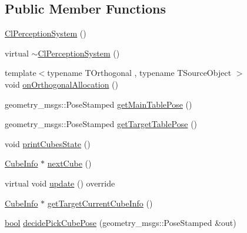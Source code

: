 \subsection*{Public Member Functions}
\begin{DoxyCompactItemize}
\item 
\hyperlink{classsm__fetch__screw__loop__1_1_1cl__perception__system_1_1ClPerceptionSystem_a1fef881e55daa7cf9dd314b7e39d26f6}{Cl\+Perception\+System} ()
\item 
virtual \hyperlink{classsm__fetch__screw__loop__1_1_1cl__perception__system_1_1ClPerceptionSystem_ae6a3da6a51db614cc1131f495ff10ec3}{$\sim$\+Cl\+Perception\+System} ()
\item 
{\footnotesize template$<$typename T\+Orthogonal , typename T\+Source\+Object $>$ }\\void \hyperlink{classsm__fetch__screw__loop__1_1_1cl__perception__system_1_1ClPerceptionSystem_ad6620a9824a17322ed043a1c1f4283c4}{on\+Orthogonal\+Allocation} ()
\item 
geometry\+\_\+msgs\+::\+Pose\+Stamped \hyperlink{classsm__fetch__screw__loop__1_1_1cl__perception__system_1_1ClPerceptionSystem_a8d206006205507fb2a34c0fc0fa80abb}{get\+Main\+Table\+Pose} ()
\item 
geometry\+\_\+msgs\+::\+Pose\+Stamped \hyperlink{classsm__fetch__screw__loop__1_1_1cl__perception__system_1_1ClPerceptionSystem_a11be4da365581400d03e897fa8171719}{get\+Target\+Table\+Pose} ()
\item 
void \hyperlink{classsm__fetch__screw__loop__1_1_1cl__perception__system_1_1ClPerceptionSystem_afcfc92b39e72177e9917cec8642da11f}{print\+Cubes\+State} ()
\item 
\hyperlink{structsm__fetch__screw__loop__1_1_1cl__perception__system_1_1CubeInfo}{Cube\+Info} $\ast$ \hyperlink{classsm__fetch__screw__loop__1_1_1cl__perception__system_1_1ClPerceptionSystem_a9035ba086c67f787377f796a49f3b8b7}{next\+Cube} ()
\item 
virtual void \hyperlink{classsm__fetch__screw__loop__1_1_1cl__perception__system_1_1ClPerceptionSystem_a099122cff1991d93c82cf07af05395f3}{update} () override
\item 
\hyperlink{structsm__fetch__screw__loop__1_1_1cl__perception__system_1_1CubeInfo}{Cube\+Info} $\ast$ \hyperlink{classsm__fetch__screw__loop__1_1_1cl__perception__system_1_1ClPerceptionSystem_a7db81d4aa99849818668b52aee431816}{get\+Target\+Current\+Cube\+Info} ()
\item 
\hyperlink{classbool}{bool} \hyperlink{classsm__fetch__screw__loop__1_1_1cl__perception__system_1_1ClPerceptionSystem_a58623800c82e415cd718cf891045f362}{decide\+Pick\+Cube\+Pose} (geometry\+\_\+msgs\+::\+Pose\+Stamped \&out)

\end{DoxyCompactItemize}
